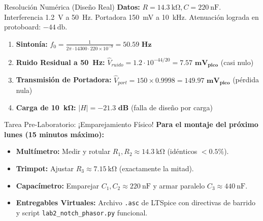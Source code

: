 \documentclass[aspectratio=169, 10pt]{beamer}
\begin{document}
\begin{frame}{Resolución Numérica (Diseño Real)}
    \textbf{Datos:} $R = \qty{14.3}{\kilo\ohm}, C = \qty{220}{\nano\farad}$. Interferencia \qty{1.2}{\volt} a \qty{50}{\hertz}. Portadora \qty{150}{\milli\volt} a \qty{10}{\kilo\hertz}. Atenuación lograda en protoboard: $\qty{-44}{\decibel}$.
    \vspace{0.3cm}
    \begin{enumerate}[itemsep=6pt]
        \item \textbf{Sintonía:} $f_0 = \frac{1}{2\pi \cdot 14300 \cdot 220\times 10^{-9}} = \mathbf{50.59\text{ Hz}}$
        \item \textbf{Ruido Residual a \qty{50}{\hertz}:} $\hat{V}_{ruido} = 1.2 \cdot 10^{-44/20} = \mathbf{7.57\text{ mV}_{pico}}$ (casi nulo)
        \item \textbf{Transmisión de Portadora:} $\hat{V}_{port} = 150 \times 0.9998 = \mathbf{149.97\text{ mV}_{pico}}$ (pérdida nula)
        \item \textbf{Carga de \qty{10}{\kilo\ohm}:} $\vert{}H\vert{} = \mathbf{-21.3\text{ dB}}$ (falla de diseño por carga)
    \end{enumerate}
\end{frame}

\begin{frame}{Tarea Pre-Laboratorio: ¡Emparejamiento Físico!}
    \textbf{Para el montaje del próximo lunes (15 minutos máximo):}
    \vspace{0.3cm}
    \begin{itemize}[itemsep=5pt]
        \item \textbf{Multímetro:} Medir y rotular $R_1, R_2 \approx \qty{14.3}{\kilo\ohm}$ (idénticos $< 0.5\%$).
        \item \textbf{Trimpot:} Ajustar $R_3 \approx \qty{7.15}{\kilo\ohm}$ (exactamente la mitad).
        \item \textbf{Capacímetro:} Emparejar $C_1, C_2 \approx \qty{220}{\nano\farad}$ y armar paralelo $C_3 \approx \qty{440}{\nano\farad}$.
        \item \textbf{Entregables Virtuales:} Archivo \texttt{.asc} de LTSpice con directivas de barrido y script \texttt{lab2\_notch\_phasor.py} funcional.
    \end{itemize}
\end{frame}
\end{document}

